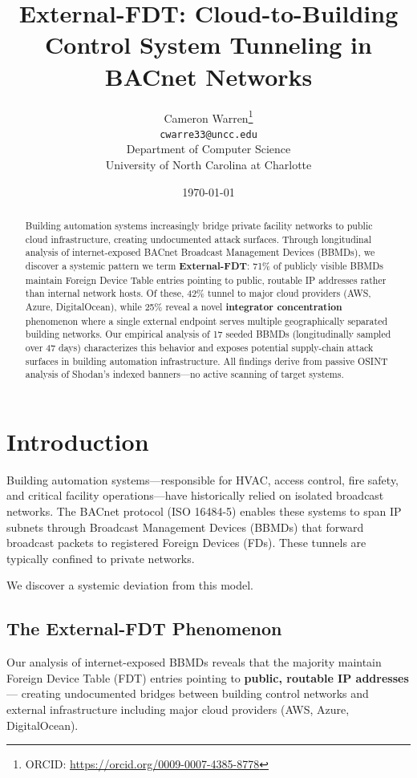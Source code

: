 \documentclass[11pt,a4paper]{article}
\title{External-FDT: Cloud-to-Building Control System Tunneling in BACnet Networks}
\author{Cameron Warren\thanks{ORCID: \url{https://orcid.org/0009-0007-4385-8778}}\\
  \texttt{cwarre33@uncc.edu}\\[0.5em]
  Department of Computer Science\\
  University of North Carolina at Charlotte
}
\date{\today}
\begin{document}
\maketitle

\begin{abstract}
Building automation systems increasingly bridge private facility networks to public 
cloud infrastructure, creating undocumented attack surfaces. Through longitudinal 
analysis of internet-exposed BACnet Broadcast Management Devices (BBMDs), we 
discover a systemic pattern we term \textbf{External-FDT}: 71\% of publicly visible 
BBMDs maintain Foreign Device Table entries pointing to public, routable IP addresses 
rather than internal network hosts. Of these, 42\% tunnel to major cloud providers 
(AWS, Azure, DigitalOcean), while 25\% reveal a novel \textbf{integrator concentration} 
phenomenon where a single external endpoint serves multiple geographically separated 
building networks. Our empirical analysis of 17 seeded BBMDs (longitudinally sampled over 
47 days) characterizes this behavior and exposes potential supply-chain attack 
surfaces in building automation infrastructure. All findings derive from passive 
OSINT analysis of Shodan's indexed banners---no active scanning of target systems.
\end{abstract}

\section{Introduction}
\label{sec:intro}

Building automation systems---responsible for HVAC, access control, fire safety, and 
critical facility operations---have historically relied on isolated 
broadcast networks. The BACnet protocol (ISO 16484-5)\cite{ashrae2016bacnet} enables these systems 
to span IP subnets through Broadcast Management Devices (BBMDs) that forward 
broadcast packets to registered Foreign Devices (FDs). These tunnels are 
typically confined to private networks\cite{newman2009bacnet}.

We discover a systemic deviation from this model.

\subsection{The External-FDT Phenomenon}

Our analysis of internet-exposed BBMDs reveals that the majority maintain 
Foreign Device Table (FDT) entries pointing to \textbf{public, routable IP addresses}---
creating undocumented bridges between building control networks and external 
infrastructure including major cloud providers (AWS, Azure, DigitalOcean).
\end{document}
